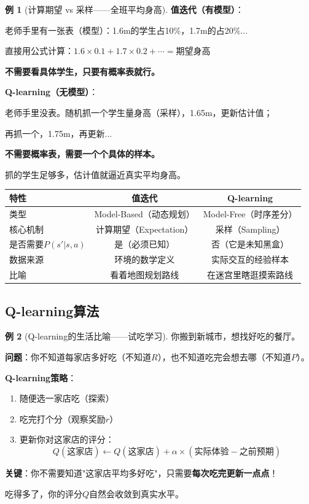 \documentclass[11pt,a4paper]{article}
\theoremstyle{definition}
\newtheorem{example}{例}[section]
\begin{document}
\begin{example}[计算期望 vs 采样——全班平均身高]
\textbf{值迭代（有模型）}：

老师手里有一张表（模型）：1.6m的学生占10\%，1.7m的占20\%...

直接用公式计算：$1.6 \times 0.1 + 1.7 \times 0.2 + \cdots = \text{期望身高}$

\textbf{不需要看具体学生，只要有概率表就行。}

\textbf{Q-learning（无模型）}：

老师手里没表。随机抓一个学生量身高（采样），1.65m，更新估计值；

再抓一个，1.75m，再更新...

\textbf{不需要概率表，需要一个个具体的样本。}

抓的学生足够多，估计值就逼近真实平均身高。
\end{example}

\begin{center}
\begin{tabular}{l|c|c}
\toprule
\textbf{特性} & \textbf{值迭代} & \textbf{Q-learning} \\
\midrule
类型 & Model-Based（动态规划） & Model-Free（时序差分） \\
核心机制 & 计算期望（Expectation） & 采样（Sampling） \\
是否需要$P(s'|s,a)$ & 是（必须已知） & 否（它是未知黑盒） \\
数据来源 & 环境的数学定义 & 实际交互的经验样本 \\
比喻 & 看着地图规划路线 & 在迷宫里瞎逛摸索路线 \\
\bottomrule
\end{tabular}
\end{center}

\subsection{Q-learning算法}

\begin{example}[Q-learning的生活比喻——试吃学习]
你搬到新城市，想找好吃的餐厅。

\textbf{问题}：你不知道每家店多好吃（不知道$R$），也不知道吃完会想去哪（不知道$P$）。

\textbf{Q-learning策略}：
\begin{enumerate}
    \item 随便选一家店吃（探索）
    \item 吃完打个分（观察奖励$r$）
    \item 更新你对这家店的评分：
    \[
    Q(\text{这家店}) \leftarrow Q(\text{这家店}) + \alpha \times (\text{实际体验} - \text{之前预期})
    \]
\end{enumerate}

\textbf{关键}：你不需要知道"这家店平均多好吃"，只需要\textbf{每次吃完更新一点点}！

吃得多了，你的评分$Q$自然会收敛到真实水平。
\end{example}
\end{document}
